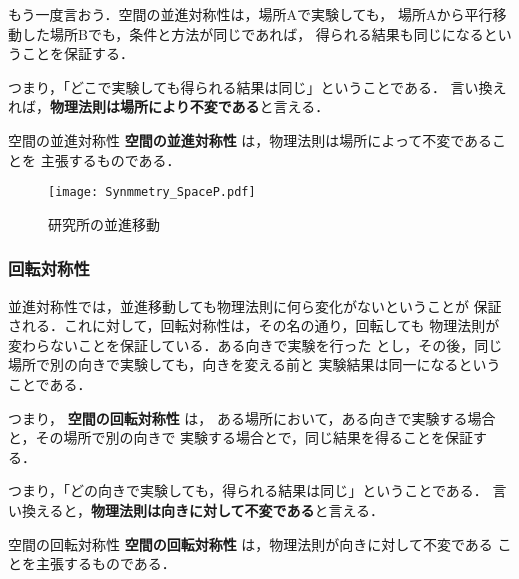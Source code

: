                 もう一度言おう．空間の並進対称性は，場所Aで実験しても，
                場所Aから平行移動した場所Bでも，条件と方法が同じであれば，
                得られる結果も同じになるということを保証する．

                つまり，「どこで実験しても得られる結果は同じ」ということである．
                言い換えれば，\textbf{物理法則は場所により不変である}と言える．
                    \begin{myshadebox}{空間の並進対称性}
                        \textbf{空間の並進対称性} は，物理法則は場所によって不変であることを
                        主張するものである．
                    \end{myshadebox}

                    \begin{figure}[hbt]
                        \begin{center}
                            \texttt{[image: Synmmetry\_SpaceP.pdf]}
                            \caption{研究所の並進移動}
                            \label{fig:Synmmetry_SpaceP}
                        \end{center}
                    \end{figure}


            \subsubsection{回転対称性}
                並進対称性では，並進移動しても物理法則に何ら変化がないということが
                保証される．これに対して，回転対称性は，その名の通り，回転しても
                物理法則が変わらないことを保証している．ある向きで実験を行った
                とし，その後，同じ場所で別の向きで実験しても，向きを変える前と
                実験結果は同一になるということである．

                つまり，
                \textbf{空間の回転対称性} は，
                ある場所において，ある向きで実験する場合と，その場所で別の向きで
                実験する場合とで，同じ結果を得ることを保証する．

                つまり，「どの向きで実験しても，得られる結果は同じ」ということである．
                言い換えると，\textbf{物理法則は向きに対して不変である}と言える．
                    \begin{myshadebox}{空間の回転対称性}
                        \textbf{空間の回転対称性} は，物理法則が向きに対して不変である
                        ことを主張するものである．
                    \end{myshadebox}

